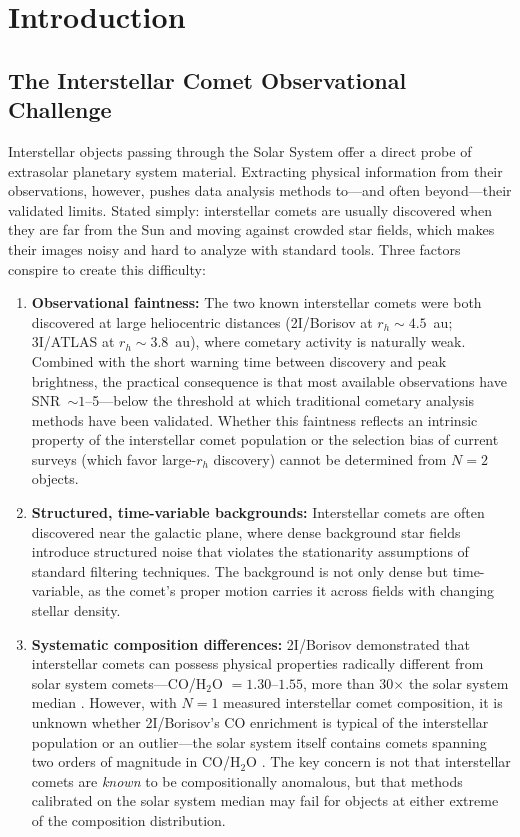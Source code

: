 \documentclass[usenatbib]{mnras}
\begin{document}
\section{Introduction}\label{sec:intro}

\subsection{The Interstellar Comet Observational Challenge}

Interstellar objects passing through the Solar System offer a direct probe of extrasolar planetary system material. Extracting physical information from their observations, however, pushes data analysis methods to---and often beyond---their validated limits. Stated simply: interstellar comets are usually discovered when they are far from the Sun and moving against crowded star fields, which makes their images noisy and hard to analyze with standard tools. Three factors conspire to create this difficulty:

\begin{enumerate}
    \item \textbf{Observational faintness:} The two known interstellar comets were both discovered at large heliocentric distances (2I/Borisov at $r_h \sim 4.5$~au; 3I/ATLAS at $r_h \sim 3.8$~au), where cometary activity is naturally weak. Combined with the short warning time between discovery and peak brightness, the practical consequence is that most available observations have SNR~$\sim 1$--5---below the threshold at which traditional cometary analysis methods have been validated. Whether this faintness reflects an intrinsic property of the interstellar comet population or the selection bias of current surveys (which favor large-$r_h$ discovery) cannot be determined from $N=2$ objects.
    \item \textbf{Structured, time-variable backgrounds:} Interstellar comets are often discovered near the galactic plane, where dense background star fields introduce structured noise that violates the stationarity assumptions of standard filtering techniques. The background is not only dense but time-variable, as the comet's proper motion carries it across fields with changing stellar density.
    \item \textbf{Systematic composition differences:} 2I/Borisov demonstrated that interstellar comets can possess physical properties radically different from solar system comets---CO/H$_2$O $= 1.30$--$1.55$, more than 30$\times$ the solar system median \citep{bodewits20,opitom21}. However, with $N=1$ measured interstellar comet composition, it is unknown whether 2I/Borisov's CO enrichment is typical of the interstellar population or an outlier---the solar system itself contains comets spanning two orders of magnitude in CO/H$_2$O \citep{bockelee04}. The key concern is not that interstellar comets are \textit{known} to be compositionally anomalous, but that methods calibrated on the solar system median may fail for objects at either extreme of the composition distribution.
\end{enumerate}
\end{document}
